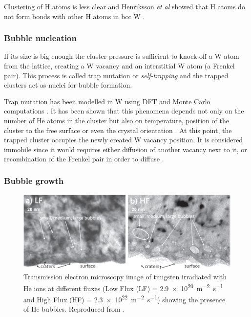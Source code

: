 Clustering of H atoms is less clear and Henriksson \textit{et al} showed that H atoms do not form bonds with other H atoms in bcc W .

\subsubsection{Bubble nucleation}

If its size is big enough the cluster pressure is sufficient to knock off a W atom from the lattice, creating a W vacancy and an interstitial W atom (a Frenkel pair).
This process is called trap mutation or \textit{self-trapping} and the trapped clusters act as nuclei for bubble formation.

Trap mutation has been modelled in W using DFT  and Monte Carlo computations .
It has been shown that this phenomena depends not only on the number of He atoms in the cluster but also on temperature, position of the cluster to the free surface or even the crystal orientation .
At this point, the trapped cluster occupies the newly created W vacancy position.
It is considered immobile since it would requires either diffusion of another vacancy next to it, or recombination of the Frenkel pair in order to diffuse .

\subsubsection{Bubble growth}

\begin{figure} [h!]
    \centering
    \includegraphics[width=\linewidth]{Figures/Chapter1/helium_bubbles_ialovega.jpg}
    \caption{Transmission electron microscopy image of tungsten irradiated with He ions at different fluxes (Low Flux (LF) = \SI{2.9e20}{m^{-2}.s^{-1}} and High Flux (HF) = \SI{2.3e22}{m^{-2}.s^{-1}}) showing the presence of He bubbles. Reproduced from \cite{ialovega_hydrogen_2020}.}
\end{figure}

